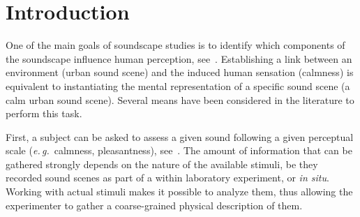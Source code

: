 \documentclass[12pt]{elsarticle}
\newcommand{\eg}{\emph{e.\,g.}}
\begin{document}
\setlength{\parindent}{5ex}

\section{Introduction}
\label{sec:intro}


One of the main goals of soundscape studies is to identify which components of the soundscape influence human perception, see~\cite{aletta2016soundscape}. Establishing a link between an environment (urban sound scene) and the induced human sensation (calmness) is equivalent to instantiating the mental representation of a specific sound scene (a calm urban sound scene). Several means have been considered in the literature to perform this task.


First, a subject can be asked to assess a given sound following a given perceptual scale (\eg~calmness, pleasantness), see~\cite{axelsson2005soundscape,davies2013perception,cain2013development}. The amount of information that can be gathered strongly depends on the nature of the available stimuli, be they recorded sound scenes as part of a within laboratory experiment, or \emph{in situ}. Working with actual stimuli makes it possible to analyze them, thus allowing the experimenter to gather a coarse-grained physical description of them.

\end{document}
